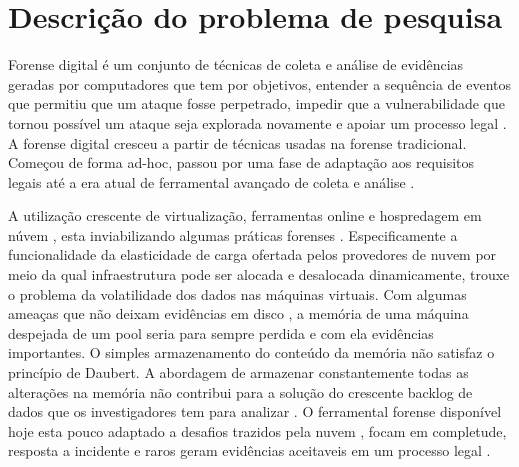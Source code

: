 \documentclass[12pt,				%
	openright,			%
	oneside,			%
	a4paper,			%
	english,			%
	brazil				%
	]{abntex2}
\begin{document}




\textual

\chapter{Descrição do problema de pesquisa} \label{chap:intro}
%
Forense digital é um conjunto de técnicas de coleta e análise de evidências geradas por computadores que tem por objetivos, entender a sequência de eventos que permitiu que um 
ataque fosse perpetrado, impedir que a vulnerabilidade que tornou possível um ataque seja explorada novamente e apoiar um processo legal \cite{Sang2013}. A forense digital 
cresceu a partir de técnicas usadas na forense tradicional. Começou de forma ad-hoc, passou por uma fase de adaptação aos requisitos legais até a era atual de ferramental
avançado de coleta e análise \cite{Charters2009}.

A utilização crescente de virtualização, ferramentas online e hospredagem em núvem \cite{Amazon2016}, esta inviabilizando algumas práticas forenses \cite{Sharma2012}. 
Especificamente a funcionalidade da elasticidade de carga ofertada pelos provedores de nuvem por meio da qual infraestrutura pode ser alocada e desalocada dinamicamente, 
trouxe o problema da volatilidade dos dados nas máquinas virtuais. Com algumas ameaças que não deixam evidências em disco \cite{Rafique2013}, a memória de uma máquina 
despejada de um pool seria para sempre perdida e com ela evidências importantes. O simples armazenamento do conteúdo da memória não satisfaz o princípio de Daubert. 
A abordagem de armazenar constantemente todas as alterações na memória não contribui para a solução do crescente backlog de dados que os investigadores tem para
analizar \cite{Quick2014}. O ferramental forense disponível hoje esta pouco adaptado a desafios trazidos pela nuvem \cite{Dykstra2012a}, focam em completude, resposta a 
incidente e raros geram evidências aceitaveis em um processo legal \cite{Reichert2015}. \\
\end{document}
